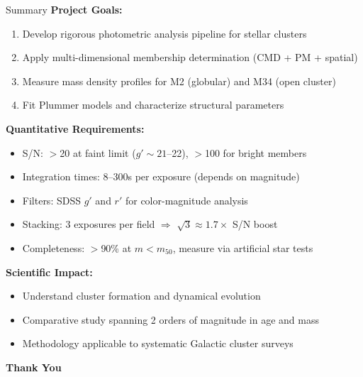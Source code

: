 \documentclass{beamer}
\begin{document}

\begin{frame}{Summary}
    \textbf{Project Goals:}
    \begin{enumerate}
        \item Develop rigorous photometric analysis pipeline for stellar clusters
        \item Apply multi-dimensional membership determination (CMD + PM + spatial)
        \item Measure mass density profiles for M2 (globular) and M34 (open cluster)
        \item Fit Plummer models and characterize structural parameters
    \end{enumerate}

    \vspace{0.5cm}

    \textbf{Quantitative Requirements:}
    \begin{itemize}
        \item \alert{S/N:} $>$20 at faint limit ($g' \sim 21$--22), $>$100 for bright members
        \item \alert{Integration times:} 8--300s per exposure (depends on magnitude)
        \item \alert{Filters:} SDSS $g'$ and $r'$ for color-magnitude analysis
        \item \alert{Stacking:} 3 exposures per field $\Rightarrow$ $\sqrt{3} \approx 1.7\times$ S/N boost
        \item \alert{Completeness:} $>$90\% at $m < m_{50}$, measure via artificial star tests
    \end{itemize}

    \vspace{0.5cm}

    \textbf{Scientific Impact:}
    \begin{itemize}
        \item Understand cluster formation and dynamical evolution
        \item Comparative study spanning 2 orders of magnitude in age and mass
        \item Methodology applicable to systematic Galactic cluster surveys
    \end{itemize}
\end{frame}

\begin{frame}
    \Huge{\centerline{\textbf{Thank You}}}
\end{frame}
\end{document}
